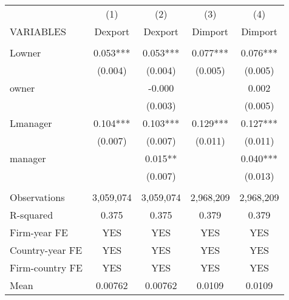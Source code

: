 \begin{tabular}{lcccc} \hline
 & (1) & (2) & (3) & (4) \\
VARIABLES & Dexport & Dexport & Dimport & Dimport \\ \hline
 &  &  &  &  \\
Lowner & 0.053*** & 0.053*** & 0.077*** & 0.076*** \\
 & (0.004) & (0.004) & (0.005) & (0.005) \\
owner &  & -0.000 &  & 0.002 \\
 &  & (0.003) &  & (0.005) \\
Lmanager & 0.104*** & 0.103*** & 0.129*** & 0.127*** \\
 & (0.007) & (0.007) & (0.011) & (0.011) \\
manager &  & 0.015** &  & 0.040*** \\
 &  & (0.007) &  & (0.013) \\
 &  &  &  &  \\
Observations & 3,059,074 & 3,059,074 & 2,968,209 & 2,968,209 \\
R-squared & 0.375 & 0.375 & 0.379 & 0.379 \\
Firm-year FE & YES & YES & YES & YES \\
Country-year FE & YES & YES & YES & YES \\
Firm-country FE & YES & YES & YES & YES \\
 Mean & 0.00762 & 0.00762 & 0.0109 & 0.0109 \\ \hline
\end{tabular}
